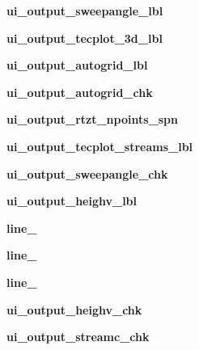 \begin{DoxyCompactItemize}
\item 
\hypertarget{a00077_ac1c6cd8619b834a5b653a36f784fb43e}{}\label{a00077_ac1c6cd8619b834a5b653a36f784fb43e} 
{\bfseries ui\+\_\+output\+\_\+sweepangle\+\_\+lbl}
\item 
\hypertarget{a00077_aacdb4037b930e2ee45ab5c333990a969}{}\label{a00077_aacdb4037b930e2ee45ab5c333990a969} 
{\bfseries ui\+\_\+output\+\_\+tecplot\+\_\+3d\+\_\+lbl}
\item 
\hypertarget{a00077_aa8b180aa3d27924eb0fe24e40d2bb03e}{}\label{a00077_aa8b180aa3d27924eb0fe24e40d2bb03e} 
{\bfseries ui\+\_\+output\+\_\+autogrid\+\_\+lbl}
\item 
\hypertarget{a00077_ad31bb569d28370ccbd2b76bb7a4b8b89}{}\label{a00077_ad31bb569d28370ccbd2b76bb7a4b8b89} 
{\bfseries ui\+\_\+output\+\_\+autogrid\+\_\+chk}
\item 
\hypertarget{a00077_a726af21c576e9cfa777b00fa72b6eadf}{}\label{a00077_a726af21c576e9cfa777b00fa72b6eadf} 
{\bfseries ui\+\_\+output\+\_\+rtzt\+\_\+npoints\+\_\+spn}
\item 
\hypertarget{a00077_ad6ef09a5ac4e379fd644cd77d0db11ca}{}\label{a00077_ad6ef09a5ac4e379fd644cd77d0db11ca} 
{\bfseries ui\+\_\+output\+\_\+tecplot\+\_\+streams\+\_\+lbl}
\item 
\hypertarget{a00077_af13e62fd96ef8e9fd80f03ca365f9117}{}\label{a00077_af13e62fd96ef8e9fd80f03ca365f9117} 
{\bfseries ui\+\_\+output\+\_\+sweepangle\+\_\+chk}
\item 
\hypertarget{a00077_a8b6a216e0c5079501ecb0faf10f28a9b}{}\label{a00077_a8b6a216e0c5079501ecb0faf10f28a9b} 
{\bfseries ui\+\_\+output\+\_\+heighv\+\_\+lbl}
\item 
\hypertarget{a00077_a7164809ee0f9eaf1fc8ef281866630e6}{}\label{a00077_a7164809ee0f9eaf1fc8ef281866630e6} 
{\bfseries line\+\_}
\item 
\hypertarget{a00077_af03231f676dd6187432bb4007a3056dd}{}\label{a00077_af03231f676dd6187432bb4007a3056dd} 
{\bfseries line\+\_}
\item 
\hypertarget{a00077_ad08c484a4323a6f6051cf71cfa1a208e}{}\label{a00077_ad08c484a4323a6f6051cf71cfa1a208e} 
{\bfseries line\+\_}
\item 
\hypertarget{a00077_a72d1aa573f44078c64d2e5c063ef15ba}{}\label{a00077_a72d1aa573f44078c64d2e5c063ef15ba} 
{\bfseries ui\+\_\+output\+\_\+heighv\+\_\+chk}
\item 
\hypertarget{a00077_a3a0f0c6441ea06c8a04d5dc13cb2dc8e}{}\label{a00077_a3a0f0c6441ea06c8a04d5dc13cb2dc8e} 
{\bfseries ui\+\_\+output\+\_\+streamc\+\_\+chk}
\item 

\end{DoxyCompactItemize}
